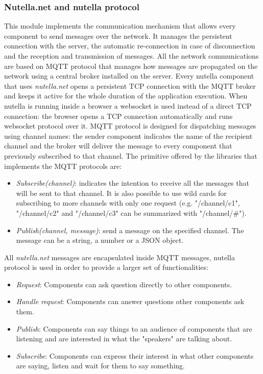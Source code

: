 \subsubsection{Nutella.net and nutella protocol}
This module implements the communication mechanism that allows every component to send messages over the network. It manages the persistent connection with the server, the automatic re-connection in case of disconnection and the reception and transmission of messages. All the network communications are based on MQTT protocol \cite{mqtt} that manages how messages are propagated on the network using a central broker installed on the server. Every nutella component that uses \textit{nutella.net} opens a persistent TCP connection with the MQTT broker and keeps it active for the whole duration of the application execution. When nutella is running inside a browser a websocket is used instead of a direct TCP connection: the browser opens a TCP connection automatically and runs websocket protocol over it. MQTT protocol is designed for dispatching messages using channel names: the sender component indicates the name of the recipient channel and the broker will deliver the message to every component that previously subscribed to that channel. The primitive offered by the libraries that implements the MQTT protocols are:
\begin{itemize}
    \item \textit{Subscribe(channel)}: indicates the intention to receive all the messages that will be sent to that channel. It is also possible to use wild cards for subscribing to more channels with only one request (e.g. "/channel/c1", "/channel/c2" and "/channel/c3" can be summarized with "/channel/\#").
    \item \textit{Publish(channel, message)}: send a message on the specified channel. The message can be a string, a number or a JSON \cite{JSON} object.
\end{itemize}
All \textit{nutella.net} messages are encapsulated inside MQTT messages, nutella protocol is used in order to provide a larger set of functionalities: 
\begin{itemize}
    \item \textit{Request}: Components can ask question directly to other components.
    \item \textit{Handle request}: Components can answer questions other components ask them.
    \item \textit{Publish}: Components can say things to an audience of components that are listening and are interested in what the "speakers" are talking about.
    \item \textit{Subscribe}: Components can express their interest in what other components are saying, listen and wait for them to say something.
\end{itemize}
